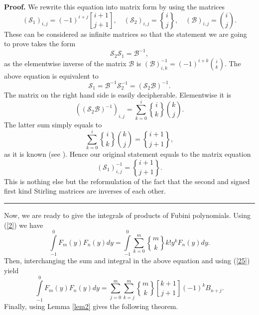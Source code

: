 \documentclass{article}%
\newenvironment{proof}[1][Proof]{\noindent\textbf{#1.} }{\ \rule{0.5em}{0.5em}}
\begin{document}
\begin{proof}
We rewrite this equation into matrix form by using the matrices
\[
(\mathcal{S}_{1})_{i,j}=(-1)^{i+j}%
\genfrac{[}{]}{0pt}{}{i+1}{j+1}%
,\quad(\mathcal{S}_{2})_{i,j}=%
\genfrac{\{}{\}}{0pt}{}{i}{j}%
,\quad(\mathcal{B})_{i,j}=\binom{i}{j}.
\]
These can be considered as infinite matrices so that the statement we are
going to prove takes the form
\[
\mathcal{S}_{2}\mathcal{S}_{1}=\mathcal{B}^{-1},
\]
as the elementwise inverse of the matrix $\mathcal{B}$ is $(\mathcal{B}%
)_{i,k}^{-1}=(-1)^{i+k}\binom{i}{k}$. The above equation is equivalent to
\[
\mathcal{S}_{1}=\mathcal{B}^{-1}\mathcal{S}_{2}^{-1}=\left(  \mathcal{S}%
_{2}\mathcal{B}\right)  ^{-1}.
\]
The matrix on the right hand side is easily decipherable. Elementwise it is
\[
(\left(  \mathcal{S}_{2}\mathcal{B}\right)  ^{-1})_{i,j}=\sum_{k=0}^{i}%
\genfrac{\{}{\}}{0pt}{}{i}{k}%
\binom{k}{j}.
\]
The latter sum simply equals to
\[
\sum_{k=0}^{i}%
\genfrac{\{}{\}}{0pt}{}{i}{k}%
\binom{k}{j}=%
\genfrac{\{}{\}}{0pt}{}{i+1}{j+1}%
,
\]
as it is known (see \cite[p. 251, formula (6.15)]{Graham}). Hence our original
statement equals to the matrix equation
\[
(\mathcal{S}_{1})_{i,j}^{-1}=%
\genfrac{\{}{\}}{0pt}{}{i+1}{j+1}%
.
\]
This is nothing else but the reformulation of the fact that the second and
signed first kind Stirling matrices are inverses of each other.
\end{proof}

Now, we are ready to give the integrals of products of Fubini polynomials.
Using (\ref{2}) we have%
\[%
{\displaystyle\int\limits_{-1}^{0}}
F_{m}\left(  y\right)  F_{n}\left(  y\right)  dy=%
{\displaystyle\int\limits_{-1}^{0}}
\sum_{k=0}^{m}%
\genfrac{\{}{\}}{0pt}{}{m}{k}%
k!y^{k}F_{n}\left(  y\right)  dy.
\]
Then, interchanging the sum and integral in the above equation and using
(\ref{25}) yield
\[%
{\displaystyle\int\limits_{-1}^{0}}
F_{m}\left(  y\right)  F_{n}\left(  y\right)  dy=\sum_{j=0}^{m}\sum_{k=j}^{m}%
\genfrac{\{}{\}}{0pt}{}{m}{k}%
\genfrac{[}{]}{0pt}{}{k+1}{j+1}%
\left(  -1\right)  ^{k}B_{n+j}.
\]
Finally, using Lemma \ref{lem2} gives the following theorem.
\end{document}
